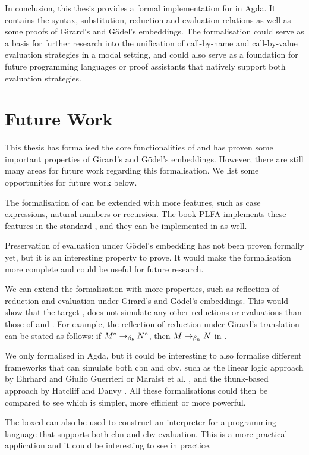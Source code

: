 In conclusion, this thesis provides a formal implementation for \lab in Agda. 
It contains the syntax, substitution, reduction and evaluation relations as well as some proofs of Girard's and Gödel's embeddings.
The formalisation could serve as a basis for further research into the unification of call-by-name and call-by-value evaluation strategies in a modal setting,
and could also serve as a foundation for future programming languages or proof assistants that natively support both evaluation strategies.

\section{Future Work}
This thesis has formalised the core functionalities of \lab and has proven some important properties of Girard's and Gödel's embeddings.
However, there are still many areas for future work regarding this formalisation. We list some opportunities for future work below.

The formalisation of \lab can be extended with more features, such as case expressions, natural numbers or recursion.
The book PLFA \cite{plfa22.08} implements these features in the standard \lc, and they can be implemented in \lab as well.

Preservation of evaluation under Gödel's embedding has not been proven formally yet, but it is an interesting property to prove.
It would make the formalisation more complete and could be useful for future research.

We can extend the formalisation with more properties, such as reflection of reduction and evaluation under Girard's and Gödel's embeddings.
This would show that the target \lab, does not simulate any other reductions or evaluations than those of \lan and \lav.
For example, the reflection of reduction under Girard's translation can be stated as follows: if ${M}^\circ \to_{\beta_b} {N}^\circ$, then $M \to_{\beta_n} N$ in \lan.

We only formalised \lab in Agda, but it could be interesting to also formalise different frameworks that can simulate both \textsf{cbn} and \textsf{cbv},
such as the linear logic approach by Ehrhard and Giulio Guerrieri \cite{EhrhardGuerrieri2016} or Maraist et al. \cite{MARAIST1999175}, 
and the thunk-based approach by Hatcliff and Danvy \cite{HATCLIFF_DANVY_1997}.
All these formalisations could then be compared to see which is simpler, more efficient or more powerful.

The boxed \lc can also be used to construct an interpreter for a programming language that supports both \textsf{cbn} and \textsf{cbv} evaluation.
This is a more practical application and it could be interesting to see \lab in practice.  